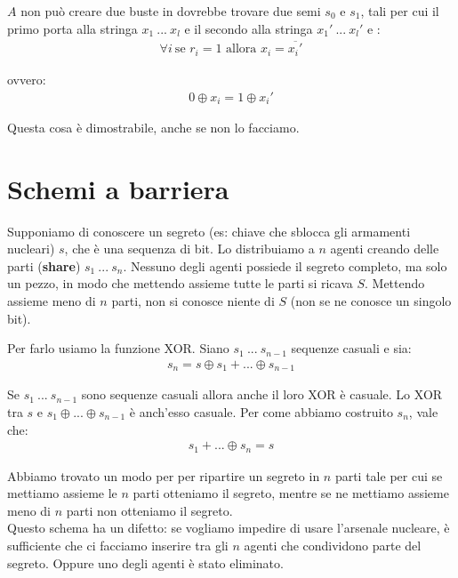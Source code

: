 \noindent $A$ non può creare due buste in dovrebbe trovare due semi $s_0$ e $s_1$, tali per cui il primo porta alla stringa $x_1 \ ... \ x_l$ e il secondo alla stringa $x_1' \ ... \ x_l'$ e :
\begin{align*}
    \forall i \ \text{se } r_i = 1 \text{ allora } x_i = \overline{x_i'}
\end{align*}

\noindent ovvero:
\begin{align*}
    0 \oplus x_i = 1 \oplus x_i'
\end{align*}

\noindent Questa cosa è dimostrabile, anche se non lo facciamo. 

\section{Schemi a barriera}

Supponiamo di conoscere un segreto (es: chiave che sblocca gli armamenti nucleari) $s$, che è una sequenza di bit. Lo distribuiamo a $n$ agenti creando delle parti (\textbf{share}) $s_1 \ ... \ s_n$. Nessuno degli agenti possiede il segreto completo, ma solo un pezzo, in modo che mettendo assieme tutte le parti si ricava $S$. Mettendo assieme meno di $n$ parti, non si conosce niente di $S$ (non se ne conosce un singolo bit).

Per farlo usiamo la funzione XOR. Siano $s_1 \ ... \ s_{n-1}$ sequenze casuali e sia:
\begin{align*}
    s_n = s \oplus s_1 \plus ... \oplus s_{n-1}
\end{align*}

\noindent Se $s_1 \ ... \ s_{n-1}$ sono sequenze casuali allora anche il loro XOR è casuale. Lo XOR tra $s$ e $s_1 \oplus ... \oplus s_{n-1}$ è anch'esso casuale. Per come abbiamo costruito $s_n$, vale che:
\begin{align*}
    s_1 \plus ... \oplus s_{n} = s
\end{align*}

\noindent Abbiamo trovato un modo per per ripartire un segreto in $n$ parti tale per cui se mettiamo assieme le $n$ parti otteniamo il segreto, mentre se ne mettiamo assieme meno di $n$ parti non otteniamo il segreto.
\\

\noindent Questo schema ha un difetto: se vogliamo impedire di usare l'arsenale nucleare, è sufficiente che ci facciamo inserire tra gli $n$ agenti che condividono parte del segreto. Oppure uno degli agenti è stato eliminato.

